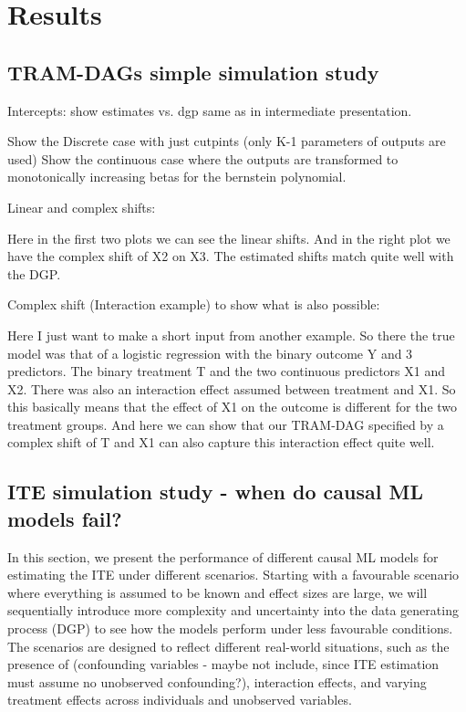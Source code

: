 






\chapter{Results}



\section{TRAM-DAGs simple simulation study}

Intercepts: show estimates vs. dgp same as in intermediate presentation.

Show the Discrete case with just cutpints (only K-1 parameters of outputs are used)
Show the continuous case where the outputs are transformed to monotonically increasing betas for the bernstein polynomial.

Linear and complex shifts: 

Here in the first two plots we can see the linear shifts. And in the right plot we have the complex shift of X2 on X3. The estimated shifts match quite well with the DGP.

Complex shift (Interaction example) to show what is also possible:

Here I just want to make a short input from another example. So there the true model was that of a logistic regression with the binary outcome Y and 3 predictors. The binary treatment T and the two continuous predictors X1 and X2. There was also an interaction effect assumed between treatment and X1. So this basically means that the effect of X1 on the outcome is different for the two treatment groups.
And here we can show that our TRAM-DAG specified by a complex shift of T and X1 can also capture this interaction effect quite well.


\section{ITE simulation study - when do causal ML models fail?}

In this section, we present the performance of different causal ML models for estimating the ITE under different scenarios. Starting with a favourable scenario where everything is assumed to be known and effect sizes are large, we will sequentially introduce more complexity and uncertainty into the data generating process (DGP) to see how the models perform under less favourable conditions. The scenarios are designed to reflect different real-world situations, such as the presence of (confounding variables - maybe not include, since ITE estimation must assume no unobserved confounding?), interaction effects, and varying treatment effects across individuals and unobserved variables.

